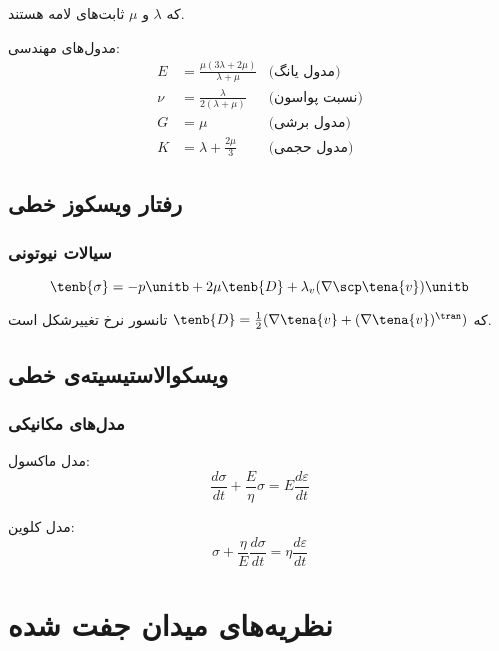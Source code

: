 که $\lambda$ و $\mu$ ثابت‌های لامه هستند.

مدول‌های مهندسی:
\begin{align}
	E   & = \frac{\mu(3\lambda + 2\mu)}{\lambda + \mu} & \text{(مدول یانگ)}   \\
	\nu & = \frac{\lambda}{2(\lambda + \mu)}           & \text{(نسبت پواسون)} \\
	G   & = \mu                                        & \text{(مدول برشی)}   \\
	K   & = \lambda + \frac{2\mu}{3}                   & \text{(مدول حجمی)}
\end{align}

\subsection{رفتار ویسکوز خطی}

\subsubsection{سیالات نیوتونی}
\begin{equation}
	\tenb{\sigma} = -p \unitb + 2\mu \tenb{D} + \lambda_v (\nabla \scp \tena{v}) \unitb
\end{equation}

که $\tenb{D} = \frac{1}{2}(\nabla \tena{v} + (\nabla \tena{v})^\tran)$ تانسور نرخ تغییرشکل است.

\subsection{ویسکوالاستیسیته‌ی خطی}

\subsubsection{مدل‌های مکانیکی}
مدل ماکسول:
\begin{equation}
	\frac{d\sigma}{dt} + \frac{E}{\eta} \sigma = E \frac{d\varepsilon}{dt}
\end{equation}

مدل کلوین:
\begin{equation}
	\sigma + \frac{\eta}{E} \frac{d\sigma}{dt} = \eta \frac{d\varepsilon}{dt}
\end{equation}

\section{نظریه‌های میدان جفت شده}

